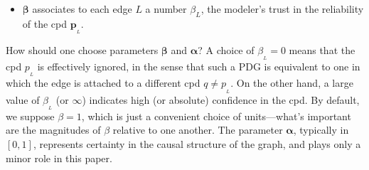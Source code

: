\documentclass[twoside]{article}
\theoremstyle{plain}
\theoremstyle{definition}
\newcommand{\mat}[1]{\mathbf{#1}}
\newcommand{\ssub}[1]{_{\!_{#1}\!}}
\newcommand{\bp}[1][L]{\mat{p}\ssub{#1}}
\newcommand{\balpha}{\boldsymbol\alpha}
\newcommand{\bbeta}{\boldsymbol\beta}
\begin{document}
\begin{defn}
\begin{itemize}[leftmargin=1.5em, itemsep=0pt]
		\item $\boldsymbol\beta$
		associates to each edge $L$ a number $\beta_L$,
		the modeler's trust in the reliability of
		the cpd
		$\bp$.%
	    \qedhere
    \end{itemize}%
\end{defn}

How should one choose parameters $\bbeta$ and $\balpha$?
A choice of $\beta\ssub L=0$ means that the cpd $p\ssub L$ is effectively ignored, in the sense that such a PDG is equivalent to one in which the edge is attached to a different cpd $q \ne p\ssub L$.
On the other hand, a large value of $\beta\ssub L$ (or $\infty$) indicates high (or absolute) confidence in the cpd. By default, we suppose $\beta\!=\! 1$, which is just a convenient choice of units---what’s important are the magnitudes of $\beta$ relative to one another.
The parameter $\balpha$, typically in $[0,1]$, represents certainty in the causal structure of the graph, and plays only a minor role in this paper.
\end{document}
